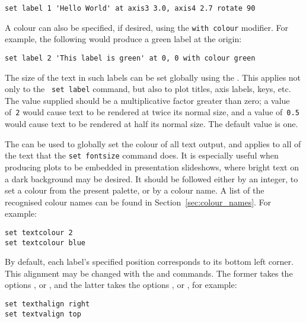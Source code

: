 \begin{verbatim}
set label 1 'Hello World' at axis3 3.0, axis4 2.7 rotate 90
\end{verbatim}

A colour can also be specified, if desired, using the {\tt with colour}
modifier.  For example, the following would produce a green label at the origin:

\begin{verbatim}
set label 2 'This label is green' at 0, 0 with colour green
\end{verbatim}

 The size of the text in such labels can be set
globally using the . This applies not only to the {\tt
set label} command, but also to plot titles, axis labels, keys, etc. The value
supplied should be a multiplicative factor greater than zero; a
value of~{\tt 2} would cause text to be rendered at twice its normal size, and
a value of~{\tt 0.5} would cause text to be rendered at half its normal size.
The default value is one.

 The  can be
used to globally set the colour of all text output, and applies to all of the
text that the {\tt set fontsize} command does. It is especially useful when
producing plots to be embedded in presentation slideshows, where bright text on
a dark background may be desired. It should be followed either by an integer,
to set a colour from the present palette, or by a colour name. A list of the
recognised colour names can be found in Section~\ref{sec:colour_names}.  For
example:

\begin{verbatim}
set textcolour 2
set textcolour blue
\end{verbatim}

By default, each label's specified
position corresponds to its bottom left corner. This alignment may be changed
with the  and  commands. The
former takes the options ,  or ,
and the latter takes the options ,  or
, for example:

\begin{verbatim}
set texthalign right
set textvalign top
\end{verbatim}

